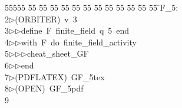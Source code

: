 %
%
\begin{tabbing}
55555 \= 55 \= 55 \= 55 \= 55 \= 55 \= 55 \= 55 \= 55 \= 55 \= 55 \= 55 \= 55 \= \>F\_5:\\[0pt]
2\>$\triangleright$\>(ORBITER)\ v\ 3\ \\[0pt]
3\>$\triangleright$\>$\triangleright$\>define\ F\ finite\_field\ q\ 5\ end\ \\[0pt]
4\>$\triangleright$\>$\triangleright$\>with\ F\ do\ finite\_field\_activity\ \\[0pt]
5\>$\triangleright$\>$\triangleright$\>$\triangleright$\>cheat\_sheet\_GF\ \\[0pt]
6\>$\triangleright$\>$\triangleright$\>end\\[0pt]
7\>$\triangleright$\>(PDFLATEX)\ GF\_5tex\\[0pt]
8\>$\triangleright$\>(OPEN)\ GF\_5pdf\\[0pt]
9\>\end{tabbing}
